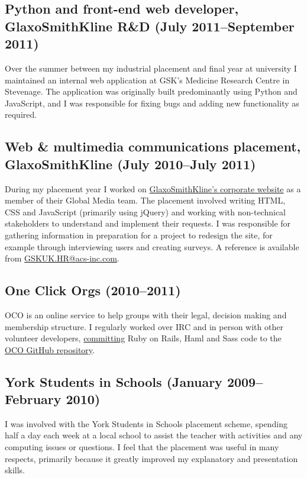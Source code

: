 \documentclass[10pt,a4paper]{article}
\begin{document}
\subsection*{Python and front-end web developer, GlaxoSmithKline R\&D (July 2011--September 2011)}

Over the summer between my industrial placement and final year at university I
maintained an internal web application at GSK's Medicine Research Centre in
Stevenage. The application was originally built predominantly using Python and
JavaScript, and I was responsible for fixing bugs and adding new functionality
as required.

\subsection*{Web \& multimedia communications placement, GlaxoSmithKline (July 2010--July 2011)}

During my placement year I worked on
\href{http://www.gsk.com/}{GlaxoSmithKline's corporate website} as a member of
their Global Media team. The placement involved writing HTML, CSS and
JavaScript (primarily using jQuery) and working with non-technical
stakeholders to understand and implement their requests. I was responsible for
gathering information in preparation for a project to redesign the site, for
example through interviewing users and creating surveys. A reference is
available from \href{mailto:GSKUK.HR@acs-inc.com}{\mbox{GSKUK.HR@acs-inc.com}}.


\subsection*{One Click Orgs (2010--2011)}

OCO is an online service to help groups with their legal, decision making and
membership structure. I regularly worked over IRC and in person with other
volunteer developers,
\href{https://github.com/oneclickorgs/one-click-orgs/commits/master?author=alexmuller}{committing}
Ruby on Rails, Haml and Sass code to the
\href{https://github.com/oneclickorgs/one-click-orgs}{OCO GitHub repository}.

\subsection*{York Students in Schools (January 2009--February 2010)}

I was involved with the York Students in Schools placement scheme, spending
half a day each week at a local school to assist the teacher with activities
and any computing issues or questions. I feel that the placement was useful in
many respects, primarily because it greatly improved my explanatory and
presentation skills.
\end{document}
